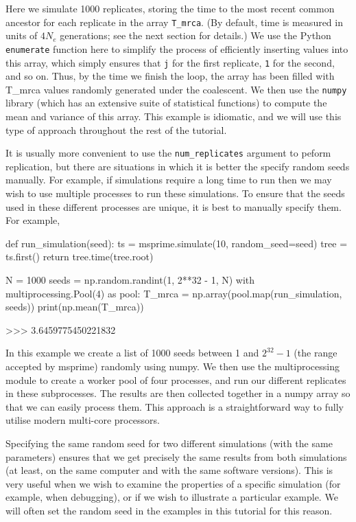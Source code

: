 \documentclass[graybox]{svmult}
\begin{document}
    Here we simulate 1000 replicates, storing the time to the most recent
common ancestor for each replicate in the array \texttt{T\_mrca}. (By
default, time is measured in units of \(4 N_e\) generations; see the
next section for details.) We use the Python \texttt{enumerate} function
here to simplify the process of efficiently inserting values into this
array, which simply ensures that \texttt{j} for the first replicate,
\texttt{1} for the second, and so on. Thus, by the time we finish the
loop, the array has been filled with T\_mrca values randomly generated
under the coalescent. We then use the \texttt{numpy} library (which has
an extensive suite of statistical functions) to compute the mean and
variance of this array. This example is idiomatic, and we will use this
type of approach throughout the rest of the tutorial.

It is usually more convenient to use the \texttt{num\_replicates}
argument to peform replication, but there are situations in which it is
better the specify random seeds manually. For example, if simulations
require a long time to run then we may wish to use multiple processes to
run these simulations. To ensure that the seeds used in these different
processes are unique, it is best to manually specify them. For example,

\begin{pythoncode}
def run_simulation(seed):
    ts = msprime.simulate(10, random_seed=seed)
    tree = ts.first()
    return tree.time(tree.root)

N = 1000
seeds = np.random.randint(1, 2**32 - 1, N)
with multiprocessing.Pool(4) as pool:
    T_mrca = np.array(pool.map(run_simulation, seeds))
print(np.mean(T_mrca))

>>> 3.6459775450221832
\end{pythoncode}

    In this example we create a list of 1000 seeds between 1 and $2^{32} -
1$ (the range accepted by msprime) randomly using numpy. We then use the
multiprocessing module to create a worker pool of four processes, and
run our different replicates in these subprocesses. The results are then
collected together in a numpy array so that we can easily process them.
This approach is a straightforward way to fully utilise modern
multi-core processors.

Specifying the same random seed for two different simulations (with the
same parameters) ensures that we get precisely the same results from
both simulations (at least, on the same computer and with the same
software versions). This is very useful when we wish to examine the
properties of a specific simulation (for example, when debugging), or if
we wish to illustrate a particular example. We will often set the random
seed in the examples in this tutorial for this reason.
\end{document}
